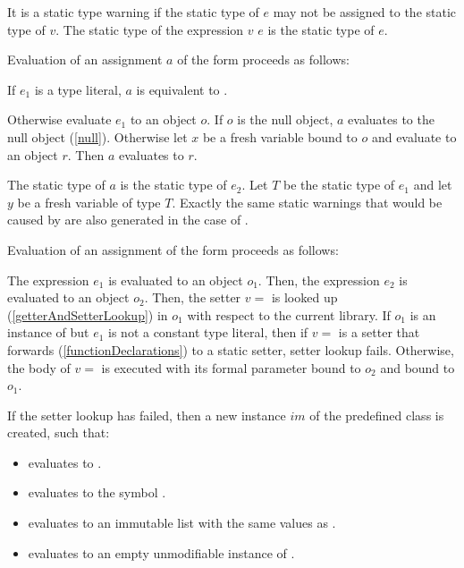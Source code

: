 \documentclass{article}
\begin{document}
\LMHash{}
It is a static type warning if the static type of $e$ may not be assigned to the static type of $v$.
The static type of the expression $v$ \code{=} $e$ is the static type of $e$.

\LMHash{}
Evaluation of an assignment $a$ of the form 
proceeds as follows:

\LMHash
If $e_1$ is a type literal, $a$ is equivalent to .

\LMHash{}
Otherwise evaluate $e_1$ to an object $o$.
If $o$ is the null object, $a$ evaluates to the null object (\ref{null}).
Otherwise let $x$ be a fresh variable bound to $o$
and evaluate  to an object $r$.
Then $a$ evaluates to $r$.

\LMHash{}
The static type of $a$ is the static type of $e_2$.
Let $T$ be the static type of $e_1$ and let $y$ be a fresh variable of type $T$.
Exactly the same static warnings that would be caused by  are also generated in the case of .

\LMHash{}
Evaluation of an assignment of the form  proceeds as follows:

\LMHash{}
The expression $e_1$ is evaluated to an object $o_1$.
Then, the expression $e_2$ is evaluated to an object $o_2$.
Then, the setter $v=$ is looked up (\ref{getterAndSetterLookup}) in $o_1$ with respect to the current library.
If $o_1$ is an instance of  but $e_1$ is not a constant type literal, then if $v=$ is a setter that forwards (\ref{functionDeclarations}) to a static setter, setter lookup fails.
Otherwise, the body of $v=$ is executed with its formal parameter bound to $o_2$ and \THIS{} bound to $o_1$.

\LMHash{}
If the setter lookup has failed, then a new instance $im$ of the predefined class  is created, such that:
\begin{itemize}
\item {} evaluates to \code{\TRUE{}}.
\item {} evaluates to the symbol .
\item {} evaluates to an immutable list with the same values as \code{[$o_2$]}.
\item {} evaluates to an empty unmodifiable instance of .
\end{itemize}
\end{document}
